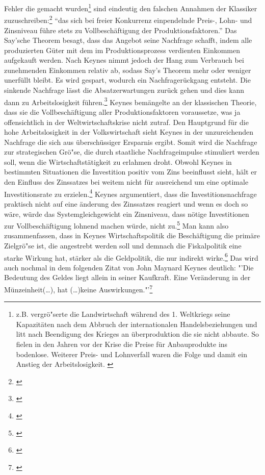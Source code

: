 \documentclass[
        onecolumn,
        a4paper,
        abstracton,
        parskip=half
        ,final
        ]{scrartcl}
\begin{document}
Fehler die gemacht wurden\footnote[602]{z.B. vergr{\"o}{"s}erte die Landwirtschaft w{\"a}hrend des 1. Weltkriegs seine Kapazit{\"a}ten nach dem Abbruch der internationalen Handelsbeziehungen und litt nach Beendigung des Krieges an {\"u}berproduktion die sie nicht abbaute. So fielen in den Jahren vor der Krise die Preise f{\"u}r Anbauprodukte ins bodenlose. Weiterer Preis- und Lohnverfall waren die Folge und damit ein Anstieg der Arbeitslosigkeit. \citep*[vgl.][S.14ff]{bombach1981theorie}} sind eindeutig den falschen Annahmen der Klassiker zuzuschreiben:\footnote[603]{\citep*[S.36]{Keynes2011}} "`das sich bei freier Konkurrenz einpendelnde Preis-, Lohn- und Zinsniveau f{\"u}hre stets zu Vollbesch{\"a}ftigung der Produktionsfaktoren."'
Das Say'sche Theorem besagt, dass das Angebot seine Nachfrage schafft, indem alle produzierten G{\"u}ter mit dem im Produktionsprozess verdienten
Einkommen aufgekauft werden. Nach Keynes nimmt jedoch der Hang zum Verbrauch bei zunehmenden Einkommen relativ ab, sodass Say's Theorem mehr oder weniger unerf{\"u}llt bleibt. Es wird gespart, wodurch ein Nachfrager{\"u}ckgang entsteht. Die sinkende
Nachfrage l{\"a}sst die Absatzerwartungen zur{\"u}ck gehen und dies kann dann zu Arbeitslosigkeit f{\"u}hren.\footnote[604]{\citep*[S.203]{peters2000}} Keynes bem{\"a}ngelte an der klassischen Theorie, dass sie die Vollbesch{\"a}ftigung aller Produktionsfaktoren voraussetze, was ja offensichtlich in
der Weltwirtschaftskrise nicht zutraf. Den Hauptgrund f{\"u}r die hohe Arbeitslosigkeit in der Volkswirtschaft sieht Keynes in der unzureichenden Nachfrage die sich aus {\"u}bersch{\"u}ssiger Ersparnis ergibt. Somit wird die Nachfrage zur strategischen Gr{\"o}{"s}e,
die durch staatliche Nachfrageimpulse stimuliert werden soll, wenn die
Wirtschaftst{\"a}tigkeit zu erlahmen droht. Obwohl Keynes in bestimmten Situationen die
Investition positiv vom Zins beeinflusst sieht, h{\"a}lt er den Einfluss des Zinssatzes
bei weitem nicht f{\"u}r ausreichend um eine optimale Investitionsrate zu erzielen.\footnote[605]{\citep*[S.208]{peters2000}}
Keynes argumentiert, dass die Investitionsnachfrage praktisch nicht auf eine
{\"a}nderung des Zinssatzes reagiert und wenn es doch so w{\"a}re, w{\"u}rde das Systemgleichgewicht
ein Zinsniveau, dass n{\"o}tige Investitionen zur Vollbesch{\"a}ftigung lohnend machen w{\"u}rde,
nicht zu.\footnote[606]{ \citep*[S.174]{bombach1981theorie}}
Man kann also zusammenfassen, dass in Keynes Wirtschaftspolitik die Besch{\"a}ftigung
die prim{\"a}re Zielgr{\"o}{"s}e ist, die angestrebt werden soll und demnach die Fiskalpolitik
eine starke Wirkung hat, st{\"a}rker als die Geldpolitik, die nur indirekt wirke.\footnote[607]{ \citep*[S.181]{bombach1981theorie}}
Das wird auch nochmal in dem folgenden Zitat von John Maynard Keynes deutlich:
"'Die Bedeutung des Geldes liegt allein in seiner Kaufkraft. Eine Ver{\"a}nderung in der
M{\"u}nzeinheit(\ldots), hat (\ldots)keine Auswirkungen."'\footnote[608]{\citep*[S.1]{Keynes1997}}
\end{document}

